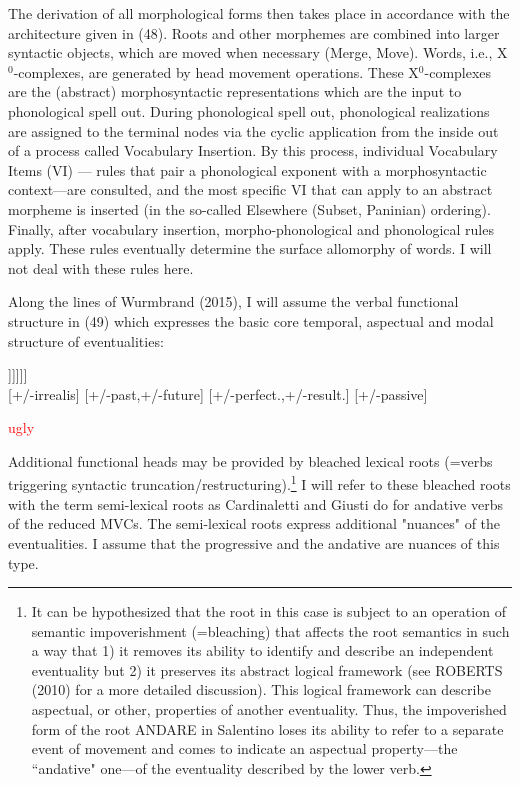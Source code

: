 \documentclass[output=paper,colorlinks,citecolor=brown,
]{langscibook}
\begin{document}
The derivation of all morphological forms then takes place in accordance with the architecture given in (48). Roots and other morphemes are combined into larger syntactic objects, which are moved when necessary (Merge, Move). Words, i.e., X$^0$-complexes, are generated by head movement operations. These X$^0$-complexes are the (abstract) morphosyntactic representations which are the input to phonological spell out.  During phonological spell out, phonological realizations are assigned to the terminal nodes via the cyclic application from the inside out of a process called Vocabulary Insertion. By this process, individual Vocabulary Items (VI) — rules that pair a phonological exponent with a morphosyntactic context—are consulted, and the most specific VI that can apply to an abstract morpheme is inserted (in the so-called Elsewhere (Subset, Paninian) ordering).  Finally, after vocabulary insertion, morpho-phonological and phonological rules apply.  These rules eventually determine the surface allomorphy of words.  I will not deal with these rules here.

Along the lines of Wurmbrand (2015), I will assume the verbal functional structure in (49) which expresses the basic core temporal, aspectual and modal structure of eventualities:

\ea \gll [MoodP Mood$^0$ [TenseP T$^0$ [AspP Asp$^0$ [VoiceP Voice$^0$ [vP v$^0$ [√p √Root$^0$ ]]]]]]\\
{} [+/-irrealis] {} [+/-past,+/-future] {}  [+/-perfect.,+/-result.] {} [+/-passive] {} {} {} {} {}\\
\z

\textcolor{red}{ugly}

Additional functional heads may be provided by bleached lexical roots (=verbs triggering syntactic truncation/restructuring).\footnote{It can be hypothesized that the root in this case is subject to an operation of semantic impoverishment (=bleaching) that affects the root semantics in such a way that 1) it removes its ability to identify and describe an independent eventuality but 2) it preserves its abstract logical framework (see ROBERTS  (2010) for a more detailed discussion).  This logical framework can describe aspectual, or other, properties of another eventuality.  Thus, the impoverished form of the root ANDARE in Salentino loses its ability to refer to a separate event of movement and comes to indicate an aspectual property—the “andative" one—of the eventuality described by the lower verb.}  I will refer to these bleached roots with the term semi-lexical roots as Cardinaletti  and Giusti do for andative verbs of the reduced MVCs. The semi-lexical roots express additional "nuances" of the eventualities.   I assume that the progressive and the andative are nuances of this type.
\end{document}
